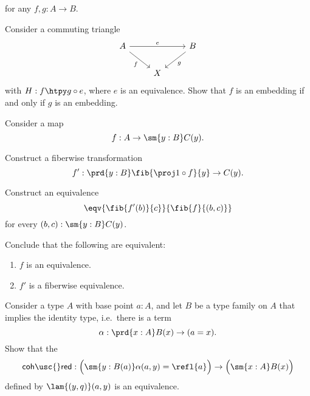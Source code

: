 \begin{exercises}
for any $f,g:A\to B$.
\item \label{ex:emb_triangle}Consider a commuting triangle
\begin{equation*}
\begin{tikzcd}
A \arrow[rr,"e"] \arrow[dr,swap,"f"] & & B \arrow[dl,"g"] \\
& X
\end{tikzcd}
\end{equation*}
with $H:f\htpy g\circ e$, where $e$ is an equivalence. Show that $f$ is an embedding if and only if $g$ is an embedding.
\item \label{ex:eqv_sigma_mv}Consider a map
\begin{equation*}
f:A \to \sm{y:B}C(y).
\end{equation*}
\begin{subexenum}
\item Construct a fiberwise transformation
\begin{equation*}
f':\prd{y:B} \fib{\proj 1\circ f}{y}\to C(y).
\end{equation*}
\item Construct an equivalence
\begin{equation*}
\eqv{\fib{f'(b)}{c}}{\fib{f}{(b,c)}}
\end{equation*}
for every $(b,c):\sm{y:B}C(y)$.
\item Conclude that the following are equivalent:
\begin{enumerate}
\item $f$ is an equivalence.
\item $f'$ is a fiberwise equivalence.
\end{enumerate}
\end{subexenum}
\item \label{ex:coh_intro}Consider a type $A$ with base point $a:A$, and let $B$ be a type family on $A$ that implies the identity type, i.e.~there is a term
\begin{equation*}
\alpha : \prd{x:A} B(x)\to (a=x).
\end{equation*}
Show that the 
\begin{equation*}
\mathsf{coh\usc{}red} : \Big(\sm{y:B(a)}\alpha(a,y)=\refl{a}\Big) \to \Big(\sm{x:A}B(x)\Big)
\end{equation*}
defined by $\lam{(y,q)}(a,y)$ is an equivalence.
\end{exercises}
